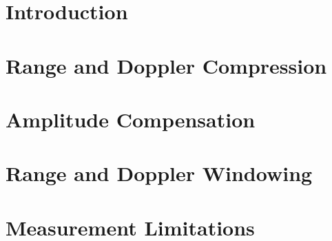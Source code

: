 \documentclass[conference]{IEEEtran}
\begin{document}
\section{Introduction}
\section{Range and Doppler Compression}
\section{Amplitude Compensation}
\section{Range and Doppler Windowing}
\section{Measurement Limitations}
\end{document}
